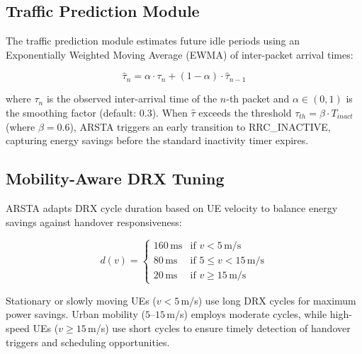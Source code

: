 \documentclass[conference]{IEEEtran}
\begin{document}
\subsection{Traffic Prediction Module}
\label{subsec:traffic_pred}

The traffic prediction module estimates future idle periods using an Exponentially Weighted Moving Average (EWMA) of inter-packet arrival times:

\begin{equation}
    \hat{\tau}_{n} = \alpha \cdot \tau_n + (1-\alpha) \cdot \hat{\tau}_{n-1}
    \label{eq:ewma}
\end{equation}

\noindent where $\tau_n$ is the observed inter-arrival time of the $n$-th packet and $\alpha \in (0,1)$ is the smoothing factor (default: 0.3). When $\hat{\tau}$ exceeds the threshold $\tau_{th} = \beta \cdot T_{inact}$ (where $\beta = 0.6$), ARSTA triggers an early transition to RRC\_INACTIVE, capturing energy savings before the standard inactivity timer expires.

\subsection{Mobility-Aware DRX Tuning}
\label{subsec:drx_tuning}

ARSTA adapts DRX cycle duration based on UE velocity to balance energy savings against handover responsiveness:

\begin{equation}
    d(v) = \begin{cases}
        160\,\text{ms} & \text{if } v < 5\,\text{m/s} \\
        80\,\text{ms} & \text{if } 5 \leq v < 15\,\text{m/s} \\
        20\,\text{ms} & \text{if } v \geq 15\,\text{m/s}
    \end{cases}
    \label{eq:drx_cycle}
\end{equation}

Stationary or slowly moving UEs ($v < 5$\,m/s) use long DRX cycles for maximum power savings. Urban mobility ($5$--$15$\,m/s) employs moderate cycles, while high-speed UEs ($v \geq 15$\,m/s) use short cycles to ensure timely detection of handover triggers and scheduling opportunities.

\end{document}
